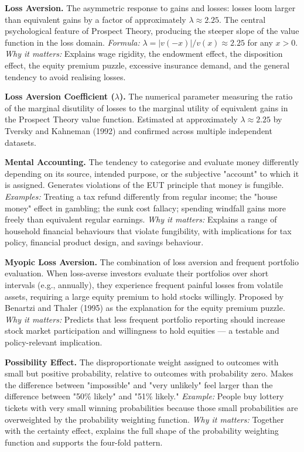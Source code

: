 \documentclass[12pt, letterpaper]{article}
\begin{document}
\textbf{Loss Aversion.} The asymmetric response to gains and losses: losses loom larger than equivalent gains by a factor of approximately $\lambda \approx 2.25$. The central psychological feature of Prospect Theory, producing the steeper slope of the value function in the loss domain. \textit{Formula:} $\lambda = |v(-x)| / v(x) \approx 2.25$ for any $x > 0$. \textit{Why it matters:} Explains wage rigidity, the endowment effect, the disposition effect, the equity premium puzzle, excessive insurance demand, and the general tendency to avoid realising losses.

\textbf{Loss Aversion Coefficient ($\lambda$).} The numerical parameter measuring the ratio of the marginal disutility of losses to the marginal utility of equivalent gains in the Prospect Theory value function. Estimated at approximately $\lambda \approx 2.25$ by Tversky and Kahneman (1992) and confirmed across multiple independent datasets.

\textbf{Mental Accounting.} The tendency to categorise and evaluate money differently depending on its source, intended purpose, or the subjective "account" to which it is assigned. Generates violations of the EUT principle that money is fungible. \textit{Examples:} Treating a tax refund differently from regular income; the "house money" effect in gambling; the sunk cost fallacy; spending windfall gains more freely than equivalent regular earnings. \textit{Why it matters:} Explains a range of household financial behaviours that violate fungibility, with implications for tax policy, financial product design, and savings behaviour.

\textbf{Myopic Loss Aversion.} The combination of loss aversion and frequent portfolio evaluation. When loss-averse investors evaluate their portfolios over short intervals (e.g., annually), they experience frequent painful losses from volatile assets, requiring a large equity premium to hold stocks willingly. Proposed by Benartzi and Thaler (1995) as the explanation for the equity premium puzzle. \textit{Why it matters:} Predicts that less frequent portfolio reporting should increase stock market participation and willingness to hold equities --- a testable and policy-relevant implication.

\textbf{Possibility Effect.} The disproportionate weight assigned to outcomes with small but positive probability, relative to outcomes with probability zero. Makes the difference between "impossible" and "very unlikely" feel larger than the difference between "50\% likely" and "51\% likely." \textit{Example:} People buy lottery tickets with very small winning probabilities because those small probabilities are overweighted by the probability weighting function. \textit{Why it matters:} Together with the certainty effect, explains the full shape of the probability weighting function and supports the four-fold pattern.
\end{document}
